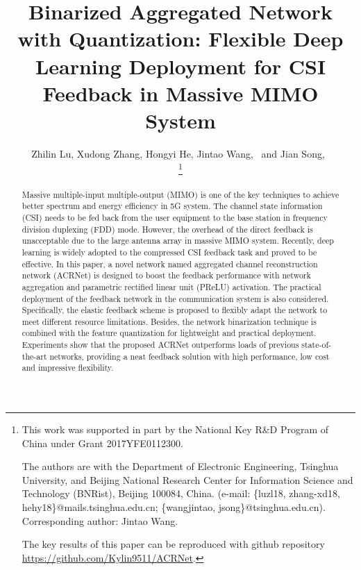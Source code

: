 \documentclass[12pt, draftclsnofoot, onecolumn]{IEEEtran}
\begin{document}
\title{Binarized Aggregated Network with Quantization: Flexible Deep Learning Deployment for CSI Feedback in Massive MIMO System}

\author{

Zhilin Lu, Xudong Zhang, Hongyi He, Jintao Wang,~ and Jian Song,~

\thanks{
This work was supported in part by the National Key R\&D Program of China under Grant 2017YFE0112300.

The authors are with the Department of Electronic Engineering, Tsinghua University, and Beijing National Research Center for Information Science and Technology (BNRist), Beijing 100084, China. (e-mail: \{luzl18, zhang-xd18, hehy18\}@mails.tsinghua.edu.cn; \{wangjintao, jsong\}@tsinghua.edu.cn). Corresponding author: Jintao Wang.

The key results of this paper can be reproduced with github repository \href{https://github.com/Kylin9511/ACRNet}{https://github.com/Kylin9511/ACRNet}.
}%
}

{}

\maketitle

\begin{abstract}
Massive multiple-input multiple-output (MIMO) is one of the key techniques to achieve better spectrum and energy efficiency in 5G system. The channel state information (CSI) needs to be fed back from the user equipment to the base station in frequency division duplexing (FDD) mode. However, the overhead of the direct feedback is unacceptable due to the large antenna array in massive MIMO system. Recently, deep learning is widely adopted to the compressed CSI feedback task and proved to be effective. In this paper, a novel network named aggregated channel reconstruction network (ACRNet) is designed to boost the feedback performance with network aggregation and parametric rectified linear unit (PReLU) activation. The practical deployment of the feedback network in the communication system is also considered. Specifically, the elastic feedback scheme is proposed to flexibly adapt the network to meet different resource limitations. Besides, the network binarization technique is combined with the feature quantization for lightweight and practical deployment. Experiments show that the proposed ACRNet outperforms loads of previous state-of-the-art networks, providing a neat feedback solution with high performance, low cost and impressive flexibility.
\end{abstract}
\end{document}
